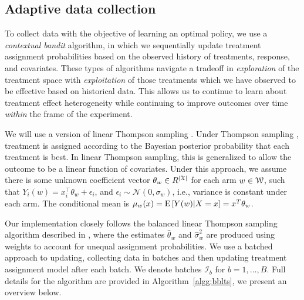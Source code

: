 \documentclass[letterpaper, 12pt, parskip=full,]{scrartcl}
\begin{document}
\subsection{Adaptive data collection}\label{adaptiveagent}

To collect data with the objective of learning an optimal policy, we use a \textit{contextual bandit} algorithm, in which we sequentially update treatment assignment probabilities based on the observed history of treatments, response, and covariates. These types of algorithms navigate a tradeoff in \textit{exploration} of the treatment space with \textit{exploitation} of those treatments which we have observed to be effective based on historical data. This allows us to continue to learn about treatment effect heterogeneity while continuing to improve outcomes over time \textit{within} the frame of the experiment. 

We will use a version of linear Thompson sampling \citep{agrawal2013thompson}. Under Thompson sampling \citep{thompson1933likelihood,thompson1935theory}, treatment is assigned according to the Bayesian posterior probability that each treatment is best. In linear Thompson sampling, this is generalized to allow the outcome to be a linear function of covariates. Under this approach, we assume there is some unknown coefficient vector $\theta_w\in R^{|{\EuScript X}|}$ for each arm $w \in {\EuScript W}$, such that $Y_i(w) = x_i^\top \theta_w + \epsilon_i$, and $\epsilon_i\sim \mathcal{N}(0, \sigma_w)$, i.e., variance is constant under each arm. The conditional mean is $\mu_w(x) = {\textrm E}\,[Y(w)|X=x] = x^T \theta_w$. 



Our implementation closely follows the balanced linear Thompson sampling algorithm described in \cite{dimakopoulou2017estimation, dimakopoulou2019balanced}, where the estimates $\hat\theta_w$ and $\hat\sigma^2_w$ are produced using weights to account for unequal assignment probabilities. We use a batched approach to updating, collecting data in batches and then updating treatment assignment model after each batch. We denote batches $\mathcal{I}_b$ for $b = 1, \dots, B$. Full details for the algorithm are provided in Algorithm~\ref{algg:bblts}, we present an overview below. 
\end{document}
